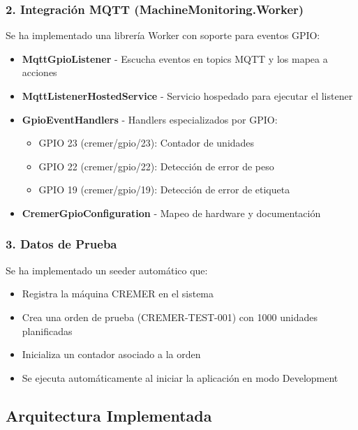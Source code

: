 \subsubsection{2. Integración MQTT (MachineMonitoring.Worker)}

Se ha implementado una librería Worker con soporte para eventos GPIO:

\begin{itemize}
    \item \textbf{MqttGpioListener} - Escucha eventos en topics MQTT y los mapea a acciones
    \item \textbf{MqttListenerHostedService} - Servicio hospedado para ejecutar el listener
    \item \textbf{GpioEventHandlers} - Handlers especializados por GPIO:
    \begin{itemize}
        \item GPIO 23 (cremer/gpio/23): Contador de unidades
        \item GPIO 22 (cremer/gpio/22): Detección de error de peso
        \item GPIO 19 (cremer/gpio/19): Detección de error de etiqueta
    \end{itemize}
    \item \textbf{CremerGpioConfiguration} - Mapeo de hardware y documentación
\end{itemize}

\subsubsection{3. Datos de Prueba}

Se ha implementado un seeder automático que:

\begin{itemize}
    \item Registra la máquina CREMER en el sistema
    \item Crea una orden de prueba (CREMER-TEST-001) con 1000 unidades planificadas
    \item Inicializa un contador asociado a la orden
    \item Se ejecuta automáticamente al iniciar la aplicación en modo Development
\end{itemize}

\subsection{Arquitectura Implementada}

